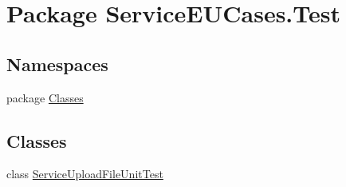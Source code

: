 \hypertarget{namespace_service_e_u_cases_1_1_test}{\section{Package Service\-E\-U\-Cases.\-Test}
\label{namespace_service_e_u_cases_1_1_test}
}
\subsection*{Namespaces}
\begin{DoxyCompactItemize}
\item 
package \hyperlink{namespace_service_e_u_cases_1_1_test_1_1_classes}{Classes}
\end{DoxyCompactItemize}
\subsection*{Classes}
\begin{DoxyCompactItemize}
\item 
class \hyperlink{class_service_e_u_cases_1_1_test_1_1_service_upload_file_unit_test}{Service\-Upload\-File\-Unit\-Test}
\end{DoxyCompactItemize}
